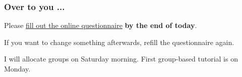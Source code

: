 \begin{frame}\frametitle{Over to you ...}
	Please \href{https://docs.google.com/spreadsheet/viewform?formkey=dERqREtHZUxVMkRuT2s4bnlzeTdXY2c6MA}{fill out the online questionnaire} \textbf{by the end of today}.



	\vspace{12pt}
	If you want to change something afterwards, refill the questionnaire again.

	\vspace{12pt}
	I will allocate groups on Saturday morning. First group-based tutorial is on Monday.

\end{frame}
